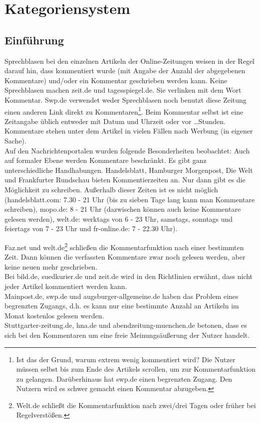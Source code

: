 \chapter{Kategoriensystem}


\section{Einführung}

Sprechblasen bei den einzelnen Artikeln der Online-Zeitungen weisen in der Regel darauf hin, dass kommentiert wurde
(mit Angabe der Anzahl der abgegebenen Kommentare) und/oder ein Kommentar
geschrieben werden kann. Keine Sprechblasen machen zeit.de und tagesspiegel.de. Sie verlinken mit dem Wort
\glqq Kommentar\grqq. Swp.de verwendet weder Sprechblasen noch benutzt diese Zeitung einen anderen 
Link direkt zu Kommentaren\footnote{Ist das der Grund, warum extrem wenig kommentiert wird? Die Nutzer 
müssen selbst bis zum Ende
des Artikels scrollen, um zur Kommentarfunktion zu gelangen. Darüberhinaus hat swp.de einen begrenzten Zugang. 
Den Nutzern wird es schwer gemacht einen Kommentar abzugeben.}.
Beim Kommentar selbst ist eine Zeitangabe üblich
entweder mit Datum und Uhrzeit oder \glqq vor \ldots Stunden\grqq.  Kommentare
stehen unter dem Artikel in vielen Fällen nach Werbung (in eigener Sache).\\
Auf den Nachrichtenportalen wurden folgende Besonderheiten beobachtet:
Auch auf formaler Ebene werden Kommentare beschränkt. Es gibt ganz
unterschiedliche Handhabungen. Handelsblatt, Hamburger Morgenpost, Die Welt und Frankfurter Rundschau bieten Kommentierzeiten an. 
Nur dann gibt es die Möglichkeit zu schreiben. Außerhalb dieser Zeiten ist es nicht
möglich (handelsblatt.com: 7.30 - 21 Uhr (bis zu sieben Tage lang kann man Kommentare schreiben), mopo.de: 8 - 21 Uhr (dazwischen können auch keine Kommentare gelesen werden), 
welt.de: werktags von 6 - 23 Uhr, samstags, sonntags und feiertags von 7 - 23 Uhr und fr-online.de: 7 - 22.30 Uhr).

Faz.net und welt.de\footnote{Welt.de schließt die Kommentarfunktion nach zwei/drei Tagen oder früher bei
  Regelverstößen.} schließen die Kommentarfunktion nach einer bestimmten
Zeit. Dann können die verfassten Kommentare zwar noch gelesen werden, aber keine
neuen mehr geschrieben. \\
Bei  bild.de, suedkurier.de und zeit.de wird in den Richtlinien erwähnt, dass nicht jeder Artikel
kommentiert werden kann.\\
Mainpost.de, swp.de und augsburger-allgemeine.de haben das Problem eines begrenzten
Zugangs, d.h. es kann nur eine bestimmte Anzahl an Artikeln im Monat kostenlos gelesen werden. \\
Stuttgarter-zeitung.de, hna.de und abendzeitung-muenchen.de betonen, dass es sich bei den Kommentaren um eine freie 
Meinungsäußerung der Nutzer handelt. 

